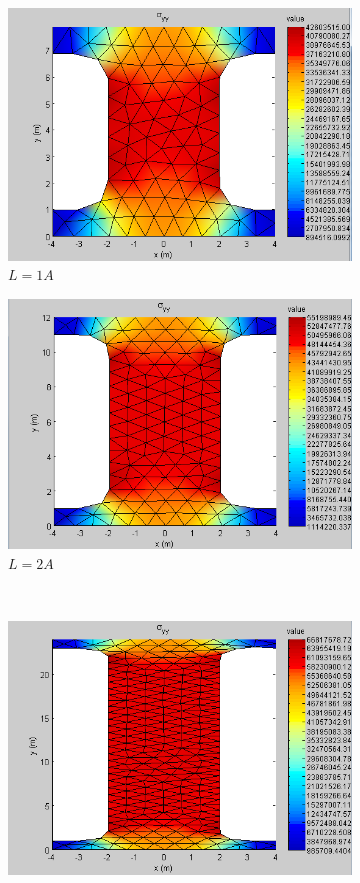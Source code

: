 \documentclass[paper=a4, fontsize=11pt]{scrartcl} %
\numberwithin{equation}{section} %
\numberwithin{figure}{section} %
\numberwithin{table}{section} %
\begin{document}
\begin{figure}[ht]
\begin{subfigure}[b]{0.45\textwidth}
		\includegraphics[width=\textwidth]{stress1.png}
		\caption{$L = 1 A$}
	\end{subfigure}
	\hfill
	\begin{subfigure}[b]{0.45\textwidth}
		\includegraphics[width=\textwidth]{stress2.png}
		\caption{$L = 2 A$}
	\end{subfigure}
	\\
	\begin{subfigure}[b]{0.45\textwidth}
		\includegraphics[width=\textwidth]{stress5.png}

\end{subfigure}
\end{figure}
\end{document}

